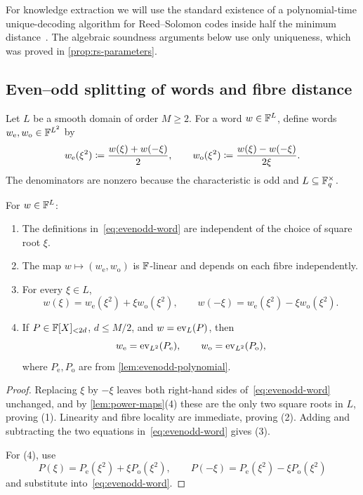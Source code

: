 For knowledge extraction we will use the standard existence of a polynomial-time unique-decoding algorithm for Reed--Solomon codes inside half the minimum distance~\cite{WelchBerlekamp86,Gao03}.  The algebraic soundness arguments below use only uniqueness, which was proved in \cref{prop:rs-parameters}.

\subsection{Even--odd splitting of words and fibre distance}
\label{sec:preliminaries-fibre-distance}

Let $L$ be a smooth domain of order $M\ge2$.  For a word $w\in\mathbb{F}^L$, define words $w_{\mathrm e},w_{\mathrm o}\in\mathbb{F}^{L^2}$ by
\begin{equation}
  w_{\mathrm e}(\xi^2)
  \coloneqq
  \frac{w(\xi)+w(-\xi)}{2},
  \qquad
  w_{\mathrm o}(\xi^2)
  \coloneqq
  \frac{w(\xi)-w(-\xi)}{2\xi}.
  \label{eq:evenodd-word}
\end{equation}
The denominators are nonzero because the characteristic is odd and $L\subseteq\mathbb{F}_q^\times$.

\begin{lemma}
\label{lem:evenodd-word}
For $w\in\mathbb{F}^L$:
\begin{enumerate}[label=(\arabic*),leftmargin=*]
  \item The definitions in~\eqref{eq:evenodd-word} are independent of the choice of square root $\xi$.
  \item The map $w\mapsto(w_{\mathrm e},w_{\mathrm o})$ is $\mathbb{F}$-linear and depends on each fibre independently.
  \item For every $\xi\in L$,
  \[
    w(\xi)=w_{\mathrm e}(\xi^2)+\xi w_{\mathrm o}(\xi^2),
    \qquad
    w(-\xi)=w_{\mathrm e}(\xi^2)-\xi w_{\mathrm o}(\xi^2).
  \]
  \item If $P\in\mathbb{F}[X]_{<2d}$, $d\le M/2$, and $w=\operatorname{ev}_L(P)$, then
  \[
    w_{\mathrm e}=\operatorname{ev}_{L^2}(P_{\mathrm e}),
    \qquad
    w_{\mathrm o}=\operatorname{ev}_{L^2}(P_{\mathrm o}),
  \]
  where $P_{\mathrm e},P_{\mathrm o}$ are from \cref{lem:evenodd-polynomial}.
\end{enumerate}
\end{lemma}

\begin{proof}
Replacing $\xi$ by $-\xi$ leaves both right-hand sides of~\eqref{eq:evenodd-word} unchanged, and by \cref{lem:power-maps}(4) these are the only two square roots in $L$, proving (1).  Linearity and fibre locality are immediate, proving (2).  Adding and subtracting the two equations in~\eqref{eq:evenodd-word} gives (3).

For (4), use
\[
  P(\xi)=P_{\mathrm e}(\xi^2)+\xi P_{\mathrm o}(\xi^2),
  \qquad
  P(-\xi)=P_{\mathrm e}(\xi^2)-\xi P_{\mathrm o}(\xi^2)
\]
and substitute into~\eqref{eq:evenodd-word}.
\end{proof}

